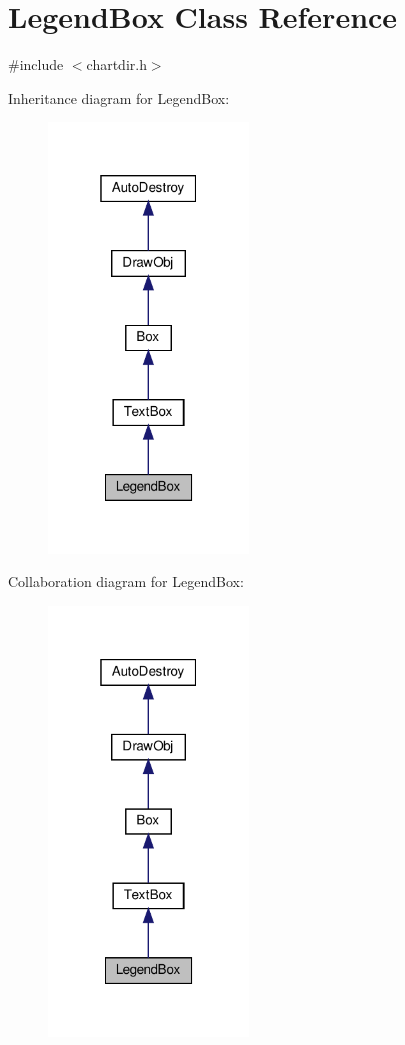 \hypertarget{class_legend_box}{}\section{Legend\+Box Class Reference}
\label{class_legend_box}


{\ttfamily \#include $<$chartdir.\+h$>$}



Inheritance diagram for Legend\+Box\+:
\nopagebreak
\begin{figure}[H]
\begin{center}
\leavevmode
\includegraphics[width=151pt]{class_legend_box__inherit__graph}
\end{center}
\end{figure}


Collaboration diagram for Legend\+Box\+:
\nopagebreak
\begin{figure}[H]
\begin{center}
\leavevmode
\includegraphics[width=151pt]{class_legend_box__coll__graph}
\end{center}
\end{figure}

